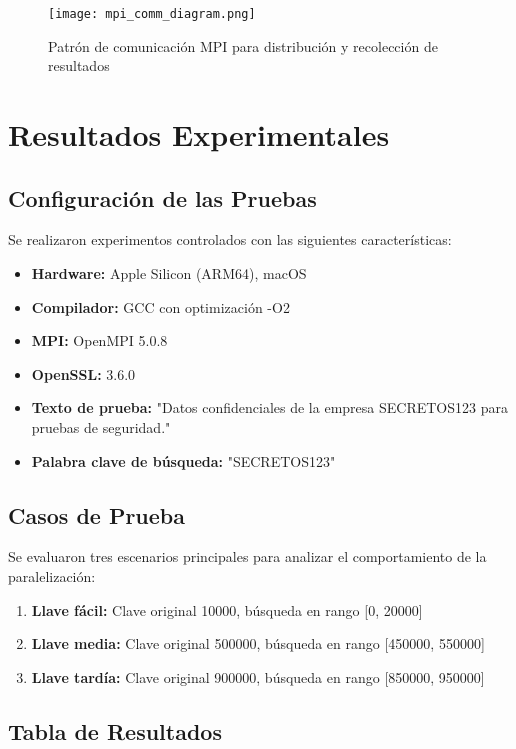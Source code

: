 \documentclass[12pt,letterpaper]{article}
\begin{document}
\begin{figure}[H]
    \centering
    \texttt{[image: mpi\_comm\_diagram.png]}
    \caption{Patrón de comunicación MPI para distribución y recolección de resultados}
    \label{fig:mpi-comm}
\end{figure}


\section{Resultados Experimentales}

\subsection{Configuración de las Pruebas}

Se realizaron experimentos controlados con las siguientes características:

\begin{itemize}
    \item \textbf{Hardware:} Apple Silicon (ARM64), macOS
    \item \textbf{Compilador:} GCC con optimización -O2
    \item \textbf{MPI:} OpenMPI 5.0.8
    \item \textbf{OpenSSL:} 3.6.0
    \item \textbf{Texto de prueba:} "Datos confidenciales de la empresa SECRETOS123 para pruebas de seguridad."
    \item \textbf{Palabra clave de búsqueda:} "SECRETOS123"
\end{itemize}

\subsection{Casos de Prueba}

Se evaluaron tres escenarios principales para analizar el comportamiento de la paralelización:

\begin{enumerate}
    \item \textbf{Llave fácil:} Clave original 10000, búsqueda en rango [0, 20000]
    \item \textbf{Llave media:} Clave original 500000, búsqueda en rango [450000, 550000]
    \item \textbf{Llave tardía:} Clave original 900000, búsqueda en rango [850000, 950000]
\end{enumerate}

\subsection{Tabla de Resultados}
\end{document}

